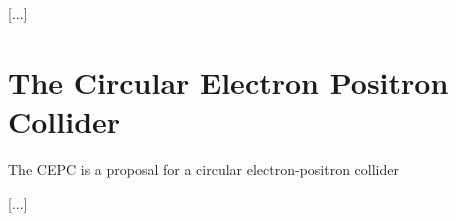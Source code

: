 
[...]

\section{The Circular Electron Positron Collider}

The \acrfull{CEPC} is a proposal for a circular electron-positron collider 

[...]